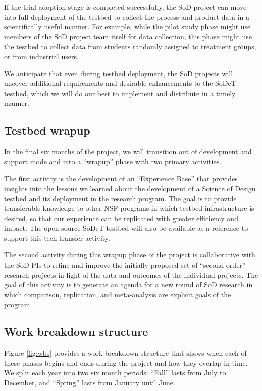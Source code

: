 If the trial adoption stage is completed successfully, the SoD project can
move into full deployment of the testbed to collect the process and product
data in a scientifically useful manner. For example, while the pilot study
phase might use members of the SoD project team itself for data collection,
this phase might use the testbed to collect data from students randomly
assigned to treatment groups, or from industrial users.

We anticipate that even during testbed deployment, the SoD projects will
uncover additional requirements and desirable enhancements to the SoDeT
testbed, which we will do our best to implement and distribute in a timely
manner.

\subsection{Testbed wrapup}

In the final six months of the project, we will transition out of
development and support mode and into a ``wrapup'' phase with two primary
activities.

The first activity is the development of an ``Experience Base''
\cite{Basili94} that provides insights into the lessons we learned about the
development of a Science of Design testbed and its deployment in the
research program.  The goal is to provide transferable knowledge to other
NSF programs in which testbed infrastructure is desired, so that our
experience can be replicated with greater efficiency and impact.  The open
source SoDeT testbed will also be available as a reference to support this
tech transfer activity.

The second activity during this wrapup phase of the project is collaborative
with the SoD PIs to refine and improve the initially proposed set of
``second order'' research projects in light of the data and outcomes of the
individual projects.  The goal of this activity is to generate an agenda
for a new round of SoD research in which comparison, replication, and
meta-analysis are explicit goals of the program.

\subsection{Work breakdown structure}

Figure \ref{fig:wbs} provides a work breakdown structure that shows when
each of these phases begins and ends during the project and how they
overlap in time.  We split each year into two six month periods: ``Fall'' 
lasts from July to December, and ``Spring'' lasts from January until June.

